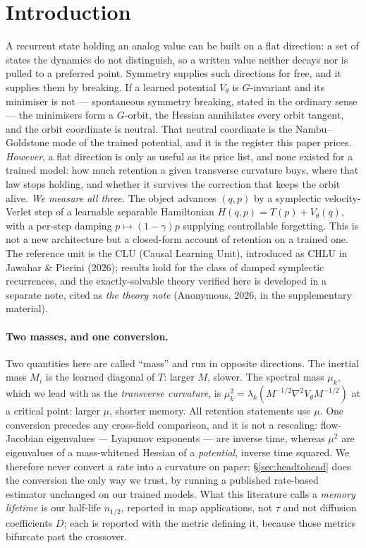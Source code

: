 \documentclass{article}
\begin{document}
\section{Introduction}\label{sec:intro}

A recurrent state holding an analog value can be built on a flat direction: a set of states the dynamics do not distinguish, so a written value neither decays nor is pulled to a preferred point. Symmetry supplies such directions for free, and it supplies them by breaking. If a learned potential $V_\theta$ is $G$-invariant and its minimiser is not --- spontaneous symmetry breaking, stated in the ordinary sense --- the minimisers form a $G$-orbit, the Hessian annihilates every orbit tangent, and the orbit coordinate is neutral. That neutral coordinate is the Nambu--Goldstone mode of the trained potential, and it is the register this paper prices. \emph{However}, a flat direction is only as useful as its price list, and none existed for a trained model: how much retention a given transverse curvature buys, where that law stops holding, and whether it survives the correction that keeps the orbit alive. \emph{We measure all three.} The object advances $(q,p)$ by a symplectic velocity-Verlet step of a learnable separable Hamiltonian $H(q,p)=T(p)+V_\theta(q)$, with a per-step damping $p\mapsto(1-\gamma)p$ supplying controllable forgetting. This is not a new architecture but a closed-form account of retention on a trained one. The reference unit is the CLU (Causal Learning Unit), introduced as CHLU in Jawahar \& Pierini (2026); results hold for the class of damped symplectic recurrences, and the exactly-solvable theory verified here is developed in a separate note, cited as \emph{the theory note} (Anonymous, 2026, in the supplementary material).

\paragraph{Two masses, and one conversion.} Two quantities here are called ``mass'' and run in opposite directions. The inertial mass $M_i$ is the learned diagonal of $T$: larger $M$, slower. The spectral mass $\mu_k$, which we lead with as the \emph{transverse curvature}, is $\mu_k^2=\lambda_k(M^{-1/2}\nabla^2V_\theta M^{-1/2})$ at a critical point: larger $\mu$, shorter memory. All retention statements use $\mu$. One conversion precedes any cross-field comparison, and it is not a rescaling: flow-Jacobian eigenvalues --- Lyapunov exponents --- are inverse time, whereas $\mu^2$ are eigenvalues of a mass-whitened Hessian of a \emph{potential}, inverse time squared. We therefore never convert a rate into a curvature on paper; \S\ref{sec:headtohead} does the conversion the only way we trust, by running a published rate-based estimator unchanged on our trained models. What this literature calls a \emph{memory lifetime} is our half-life $n_{1/2}$, reported in map applications, not $\tau$ and not diffusion coefficients $D$; each is reported with the metric defining it, because those metrics bifurcate past the crossover.
\end{document}
